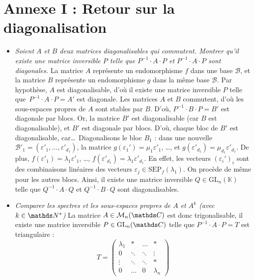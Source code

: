 \section{Annexe I : Retour sur la diagonalisation}

\begin{itemize}
	\item \textsl{Soient $A$\/ et $B$\/ deux matrices diagonalisables qui commutent. Montrer qu'il existe une matrice inversible $P$\/ telle que $P^{-1} \cdot A\cdot P$\/ et $P^{-1} \cdot A \cdot P$\/ sont diagonales.}
		La matrice $A$\/ représente un endomorphisme $f$\/ dans une base $\mathcal{B}$, et la matrice $B$\/ représente un endomorphisme $g$\/ dans la même base $\mathcal{B}$.
		Par hypothèse, $A$\/ est diagonalisable, d'où il existe une matrice inversible $P$\/ telle que~$P^{-1}\cdot A\cdot P = A'$\/ est diagonale.
		Les matrices $A$\/ et $B$\/ commutent, d'où les sous-espaces propres de $A$\/ sont stables par $B$.
		D'où, $P^{-1} \cdot B \cdot P = B'$\/ est diagonale par blocs.
		Or, la matrice $B'$\/ est diagonalisable (car $B$\/ est diagonalisable), et $B'$\/ est diagonale par blocs.
		D'où, chaque bloc de $B'$\/ est diagonalisable, car\ldots\ 
		Diagonalisons le bloc $B_1$\/ : dans une nouvelle $\mathcal{B}'_1 = (\varepsilon'_1, \ldots, \varepsilon'_{d_1})$, la matrice $g(\varepsilon_1') = \mu_1 \varepsilon'_1$, \ldots, et $g(\varepsilon'_{d_1}) = \mu_{d_1} \varepsilon'_{d_1}$. De plus, $f(\varepsilon'_1) = \lambda_1 \varepsilon'_1$, \ldots, $f(\varepsilon'_{d_1}) = \lambda_1 \varepsilon'_{d_1}$. En effet, les vecteurs $(\varepsilon_i')_i$\/ sont des combinaisons linéaires des vecteurs $\varepsilon_j \in \mathrm{SEP}_f(\lambda_1)$. On procède de même pour les autres blocs. Ainsi, il existe une matrice inversible $Q \in \mathrm{GL}_n(\mathds{K})$\/ telle que $Q^{-1}\cdot A\cdot Q$\/ et $Q^{-1}\cdot B \cdot Q$\/ sont diagonalisables.
	\item \textsl{Comparer les spectres et les sous-espaces propres de $A$\/ et $A^k$\/ (avec $k \in \N^*$)} La matrice $A \in \mathcal{M}_n(\C)$\/ est donc trigonalisable, il existe une matrice inversible $P \in \mathrm{GL}_n(\C)$\/ telle que $P^{-1}\cdot A \cdot P = T$\/ est triangulaire : \[
			T =
			\begin{pmatrix}
				\lambda_1 & * & \ldots & *\\
				0 & \ddots & \ddots & \vdots\\
				\vdots & \ddots & \ddots & *\\
				0 & \ldots & 0 & \lambda_n
			\end{pmatrix}
\]
\end{itemize}
